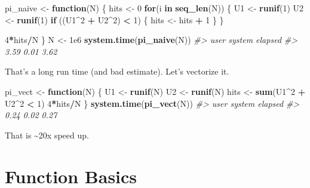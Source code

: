 \documentclass[]{book}
\newenvironment{Shaded}{\begin{snugshade}}{\end{snugshade}}
\newcommand{\KeywordTok}[1]{\textcolor[rgb]{0.13,0.29,0.53}{\textbf{#1}}}
\newcommand{\DecValTok}[1]{\textcolor[rgb]{0.00,0.00,0.81}{#1}}
\newcommand{\FloatTok}[1]{\textcolor[rgb]{0.00,0.00,0.81}{#1}}
\newcommand{\StringTok}[1]{\textcolor[rgb]{0.31,0.60,0.02}{#1}}
\newcommand{\CommentTok}[1]{\textcolor[rgb]{0.56,0.35,0.01}{\textit{#1}}}
\newcommand{\ControlFlowTok}[1]{\textcolor[rgb]{0.13,0.29,0.53}{\textbf{#1}}}
\newcommand{\OperatorTok}[1]{\textcolor[rgb]{0.81,0.36,0.00}{\textbf{#1}}}
\newcommand{\NormalTok}[1]{#1}
\theoremstyle{definition}
\theoremstyle{definition}
\theoremstyle{definition}
\theoremstyle{remark}
\begin{document}
\begin{Shaded}
\begin{Highlighting}[]
\NormalTok{pi_naive <-}\StringTok{ }\ControlFlowTok{function}\NormalTok{(N) \{}
\NormalTok{  hits <-}\StringTok{ }\DecValTok{0}
  \ControlFlowTok{for}\NormalTok{(i }\ControlFlowTok{in} \KeywordTok{seq_len}\NormalTok{(N)) \{}
\NormalTok{    U1 <-}\StringTok{ }\KeywordTok{runif}\NormalTok{(}\DecValTok{1}\NormalTok{)}
\NormalTok{    U2 <-}\StringTok{ }\KeywordTok{runif}\NormalTok{(}\DecValTok{1}\NormalTok{)}
    \ControlFlowTok{if}\NormalTok{ ((U1}\OperatorTok{^}\DecValTok{2} \OperatorTok{+}\StringTok{ }\NormalTok{U2}\OperatorTok{^}\DecValTok{2}\NormalTok{) }\OperatorTok{<}\StringTok{ }\DecValTok{1}\NormalTok{) \{}
\NormalTok{      hits <-}\StringTok{ }\NormalTok{hits }\OperatorTok{+}\StringTok{ }\DecValTok{1}
\NormalTok{    \}}
\NormalTok{  \}}
  
  \DecValTok{4}\OperatorTok{*}\NormalTok{hits}\OperatorTok{/}\NormalTok{N}
\NormalTok{\}}
\NormalTok{N <-}\StringTok{ }\FloatTok{1e6}
\KeywordTok{system.time}\NormalTok{(}\KeywordTok{pi_naive}\NormalTok{(N))}
\CommentTok{#>    user  system elapsed }
\CommentTok{#>    3.59    0.01    3.62}
\end{Highlighting}
\end{Shaded}

That's a long run time (and bad estimate). Let's vectorize it.

\begin{Shaded}
\begin{Highlighting}[]
\NormalTok{pi_vect <-}\StringTok{ }\ControlFlowTok{function}\NormalTok{(N) \{}
\NormalTok{  U1 <-}\StringTok{ }\KeywordTok{runif}\NormalTok{(N)}
\NormalTok{  U2 <-}\StringTok{ }\KeywordTok{runif}\NormalTok{(N)}
\NormalTok{  hits <-}\StringTok{ }\KeywordTok{sum}\NormalTok{(U1}\OperatorTok{^}\DecValTok{2} \OperatorTok{+}\StringTok{ }\NormalTok{U2}\OperatorTok{^}\DecValTok{2} \OperatorTok{<}\StringTok{ }\DecValTok{1}\NormalTok{)}
  \DecValTok{4}\OperatorTok{*}\NormalTok{hits}\OperatorTok{/}\NormalTok{N}
\NormalTok{\}}
\KeywordTok{system.time}\NormalTok{(}\KeywordTok{pi_vect}\NormalTok{(N))}
\CommentTok{#>    user  system elapsed }
\CommentTok{#>    0.24    0.02    0.27}
\end{Highlighting}
\end{Shaded}

That is \textasciitilde{}20x speed up.

\section{Function Basics}\label{function-basics}
\end{document}
